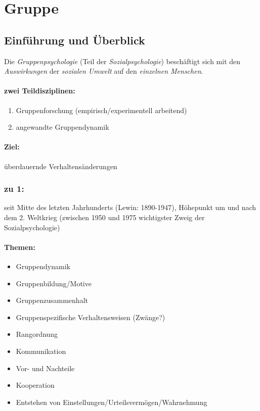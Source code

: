 \documentclass[12pt]{scrartcl}
\begin{document}
\tableofcontents \pagebreak

\section{Gruppe}

\subsection{Einführung und Überblick}
Die \emph{Gruppenpsychologie} (Teil der \emph{Sozialpsychologie}) beschäftigt
sich mit den \emph{Auswirkungen} der \emph{sozialen Umwelt} auf den
\emph{einzelnen Menschen}.

\paragraph{zwei Teildisziplinen:}
\begin{enumerate}
	\item Gruppenforschung (empirisch/experimentell arbeitend)
	\item angewandte Gruppendynamik
\end{enumerate}

\paragraph{Ziel:} überdauernde Verhaltensänderungen

\subsubsection*{zu 1:} seit Mitte des letzten Jahrhunderts (Lewin: 1890-1947),
Höhepunkt um und nach dem 2. Weltkrieg (zwischen 1950 und 1975 wichtigster
Zweig der Sozialpsychologie)

\paragraph{Themen:}
\begin{itemize}
	\item Gruppendynamik
	\item Gruppenbildung/Motive
	\item Gruppenzusammenhalt
	\item Gruppenspezifische Verhaltensweisen (Zwänge?)
	\item Rangordnung
	\item Kommunikation
	\item Vor- und Nachteile
	\item Kooperation
	\item Entstehen von Einstellungen/Urteilsvermögen/Wahrnehmung
\end{itemize}
\end{document}
